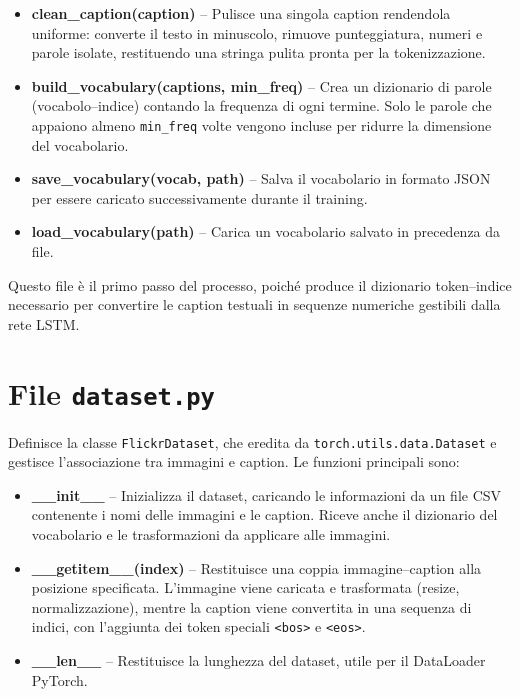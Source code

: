 \documentclass[11pt,a4paper]{report}
\newcommand{\bos}{\texttt{<bos>}}
\newcommand{\eos}{\texttt{<eos>}}
\begin{document}
\begin{itemize}
  \item \textbf{clean\_caption(caption)} – Pulisce una singola caption rendendola uniforme: converte il testo in minuscolo, rimuove punteggiatura, numeri e parole isolate, restituendo una stringa pulita pronta per la tokenizzazione.
  \item \textbf{build\_vocabulary(captions, min\_freq)} – Crea un dizionario di parole (vocabolo–indice) contando la frequenza di ogni termine. Solo le parole che appaiono almeno \texttt{min\_freq} volte vengono incluse per ridurre la dimensione del vocabolario.
  \item \textbf{save\_vocabulary(vocab, path)} – Salva il vocabolario in formato JSON per essere caricato successivamente durante il training.
  \item \textbf{load\_vocabulary(path)} – Carica un vocabolario salvato in precedenza da file.
\end{itemize}

Questo file è il primo passo del processo, poiché produce il dizionario token–indice necessario per convertire le caption testuali in sequenze numeriche gestibili dalla rete LSTM.

\section{File \texttt{dataset.py}}

Definisce la classe \texttt{FlickrDataset}, che eredita da \texttt{torch.utils.data.Dataset} e gestisce l'associazione tra immagini e caption.  
Le funzioni principali sono:

\begin{itemize}
  \item \textbf{\_\_init\_\_} – Inizializza il dataset, caricando le informazioni da un file CSV contenente i nomi delle immagini e le caption. Riceve anche il dizionario del vocabolario e le trasformazioni da applicare alle immagini.
  \item \textbf{\_\_getitem\_\_(index)} – Restituisce una coppia immagine–caption alla posizione specificata. L’immagine viene caricata e trasformata (resize, normalizzazione), mentre la caption viene convertita in una sequenza di indici, con l’aggiunta dei token speciali \bos{} e \eos{}.
  \item \textbf{\_\_len\_\_} – Restituisce la lunghezza del dataset, utile per il DataLoader PyTorch.
\end{itemize}
\end{document}
